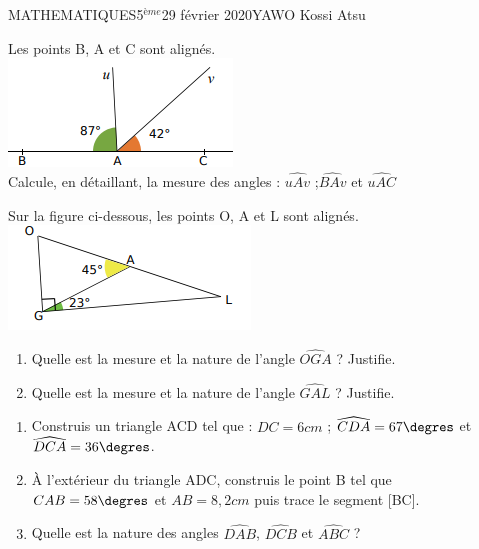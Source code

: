 \documentclass[12pt,a4paper]{book}
\newcommand{\prof}{YAWO Kossi Atsu}
\newcommand{\matiere}{MATHEMATIQUES}
\newcommand{\classe}{5$^{ème}$}
\begin{document}
\begin{td}{\matiere}{\classe}{29 février 2020}{\prof}
\begin{exo}
\setlength{\columnseprule}{1pt}
\begin{multicols}{2}
Les points B, A et C sont alignés.\\
\includegraphics[scale=0.9]{images/td_29_02_2020_img1.png}\\
Calcule, en détaillant, la mesure des angles :
$\widehat{uAv}$ \qquad ;\qquad $\widehat{BAv}$ et $\widehat{uAC}$
\end{multicols}

\end{exo}

\begin{exo}
\setlength{\columnseprule}{1pt}
\begin{multicols}{2}
Sur la figure ci-dessous, les points O, A et L sont alignés.\\
\includegraphics[scale=0.9]{images/td_29_02_2020_img2.png}\\

\begin{enumerate}
\item Quelle est la mesure et la nature de l'angle  $\widehat{OGA}$ ? Justifie.
\item Quelle est la mesure et la nature de l'angle  $\widehat{GAL}$ ? Justifie.
\end{enumerate}

\end{multicols}
\end{exo}

\begin{exo}
\setlength{\columnseprule}{1pt}
\begin{multicols}{2}
\begin{enumerate}
\item Construis un triangle ACD tel que : $DC = 6 cm$ ; $\widehat{CDA}= 67 \degres$ et $\widehat{DCA} = 36 \degres$.
\item À l'extérieur du triangle ADC, construis le point B tel que $CAB = 58\degres$ et $AB = 8,2 cm$ puis trace le segment [BC]. 
\item Quelle est la nature des angles $\widehat{DAB}$, $\widehat{DCB}$ et $\widehat{ABC}$ ?
\end{enumerate}
\end{multicols}
\end{exo}

\end{td}
\end{document}
